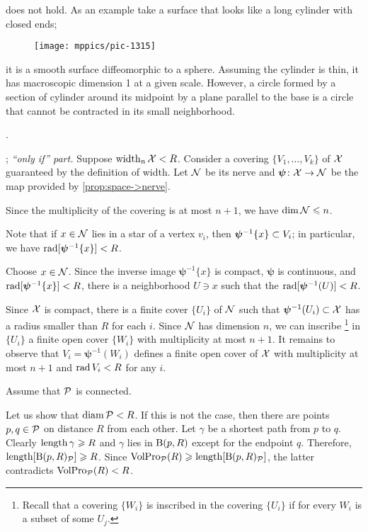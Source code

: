  does not hold.
As an example take a surface that looks like a long cylinder with closed ends;
\begin{figure}[h!]
\vskip0mm
\centering
\texttt{[image: mppics/pic-1315]}
\end{figure}
it is a smooth surface diffeomorphic to a sphere.
Assuming the cylinder is thin, it has macroscopic dimension 1 at a given scale.
However, a circle formed by a section of cylinder around its midpoint by a plane parallel to the base is a circle that cannot be contracted in its small neighborhood.

 \cite[Appendix $1(\text{E}_{2})$]{gromov-1983}.

\parbf{\ref{ex:width=suprad(inv)}}; \textit{``only if'' part.}
Suppose $\operatorname{\rm width}\nolimits_n\mathcal{X}<R$.
Consider a covering $\{V_1,\dots,V_k\}$ of $\mathcal{X}$ guaranteed by the definition of width.
Let $\mathcal{N}$ be its nerve and $\bm{\psi}\colon\mathcal{X}\to \mathcal{N}$ be the map provided by \ref{prop:space->nerve}.

Since the multiplicity of the covering is at most $n+1$, we have $\operatorname{\rm dim}\nolimits \mathcal{N}\leqslant n$.

Note that if $x\in \mathcal{N}$ lies in a star of a vertex $v_i$,
then $\bm{\psi}^{-1}\{x\}\z\subset V_i$;
in particular, we have $\mathop{\rm rad}\nolimits[\bm{\psi}^{-1}\{x\}]<R$.

Choose $x\in \mathcal{N}$.
Since the inverse image $\bm{\psi}^{-1}\{x\}$ is compact, $\bm{\psi}$ is continuous, and $\mathop{\rm rad}\nolimits[\bm{\psi}^{-1}\{x\}]<R$,
there is a neighborhood $U\ni x$ such that the  $\mathop{\rm rad}\nolimits[\bm{\psi}^{-1}(U)]<R$.

Since $\mathcal{X}$ is compact,  there is a finite cover $\{U_i\}$ of $\mathcal{N}$ such that $\bm{\psi}^{-1}(U_i)\subset\mathcal{X}$ has a radius smaller than $R$ for each $i$.
Since $\mathcal{N}$ has dimension $n$, we can inscribe%
\footnote{Recall that a covering $\{W_i\}$ is inscribed in the covering $\{U_i\}$ if for every $W_i$ is a subset of some $U_j$.} 
in $\{U_i\}$ a finite open cover $\{W_i\}$ with multiplicity at most $n+1$.
It remains to observe that $V_i=\bm{\psi}^{-1}(W_i)$ defines a finite open cover of $\mathcal{X}$ with  multiplicity at most $n+1$ and $\mathop{\rm rad}\nolimits V_i<R$ for any $i$. 

Assume that $\mathcal{P}$ is connected.

Let us show that $\operatorname{\rm diam}\nolimits\mathcal{P}<R$.
If this is not the case, then there are points $p,q\in\mathcal{P}$ on distance $R$ from each other.
Let $\gamma$ be a shortest path from $p$ to $q$.
Clearly $\mathop{\rm length}\nolimits\gamma\geqslant R$ and $\gamma$ lies in $\mathrm{B}{}(p,R)$ except for the endpoint $q$.
Therefore, $\mathop{\rm length}\nolimits[\mathrm{B}{}(p,R)_{\mathcal{P}}]\geqslant R$.
Since $\VolPro_{\spc{P}}(R)\z\ge \length[\oBall(p,R)_{\spc{P}}]$,
the latter contradicts $\operatorname{\rm VolPro}\nolimits_{\mathcal{P}}(R)<R$.

